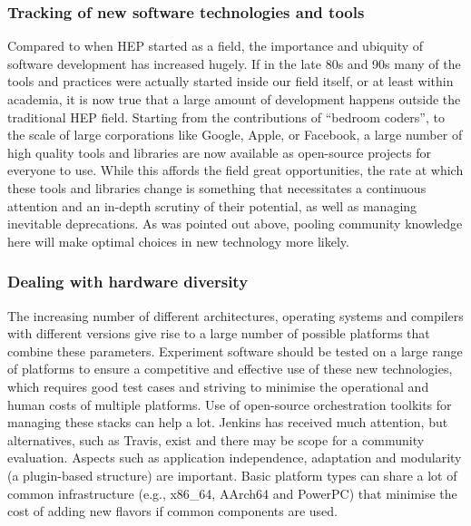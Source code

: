 \documentclass[12pt,a4paper]{article}
\begin{document}
\hypertarget{tracking-of-new-software-technologies-and-tools}{%
\subsubsection{Tracking of new software technologies and
tools}\label{tracking-of-new-software-technologies-and-tools}}

Compared to when HEP started as a field, the importance and ubiquity of
software development has increased hugely. If in the late 80s and 90s
many of the tools and practices were actually started inside our field
itself, or at least within academia, it is now true that a large amount
of development happens outside the traditional HEP field. Starting from
the contributions of ``bedroom coders'', to the scale of large
corporations like Google, Apple, or Facebook, a large number of high
quality tools and libraries are now available as open-source projects
for everyone to use. While this affords the field great opportunities,
the rate at which these tools and libraries change is something that
necessitates a continuous attention and an in-depth scrutiny of their
potential, as well as managing inevitable deprecations. As was
pointed out above, pooling community knowledge here will make optimal
choices in new technology more likely.

\hypertarget{dealing-with-hardware-diversity}{%
\subsubsection{Dealing with hardware
diversity}\label{dealing-with-hardware-diversity}}

The increasing number of different architectures, operating systems and
compilers with different versions give rise to a large number of
possible platforms that combine these parameters. Experiment software
should be tested on a large range of platforms to ensure a
competitive and effective use of these new technologies, which requires
good test cases and striving to minimise the operational and human costs
of multiple platforms. Use of open-source orchestration toolkits for
managing these stacks can help a lot. Jenkins has received much
attention, but alternatives, such as Travis, exist and there may be scope
for a community evaluation. Aspects such as application independence,
adaptation and modularity (a plugin-based structure) are important.
Basic platform types can share a lot of common infrastructure (e.g.,
x86\_64, AArch64 and PowerPC) that minimise the cost of adding new
flavors if common components are used.
\end{document}
